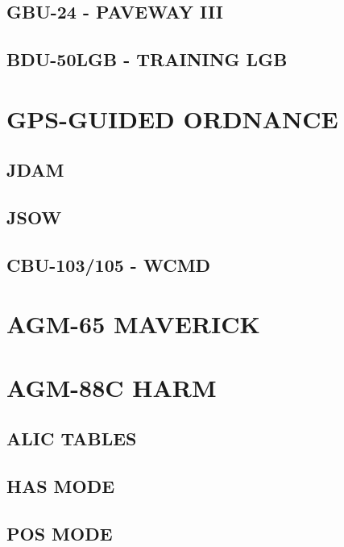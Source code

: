 \subsection{GBU-24 - PAVEWAY III}
\subsection{BDU-50LGB - TRAINING LGB}

\clearpage 

\section{GPS-GUIDED ORDNANCE}
\subsection{JDAM}
\subsection{JSOW}
\subsection{CBU-103/105 - WCMD}

\clearpage

\section{AGM-65 MAVERICK}

\clearpage 

\section{AGM-88C HARM}

\subsection{ALIC TABLES}
\subsection{HAS MODE}
\subsection{POS MODE}

\cleardoublepage